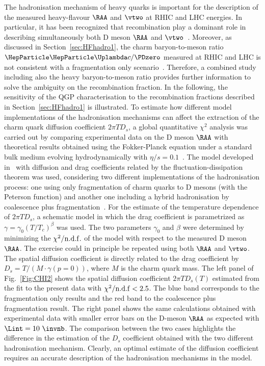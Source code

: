 The hadronisation mechanism of heavy quarks is important for the description of the measured
heavy-flavour $\RAA$ and $\vtwo$ at RHIC and LHC energies. In particular, it has been recognized that recombination
play a dominant role in describing simultaneously both D meson $\RAA$ and $\vtwo$~\cite{PhysRevC.73.034913,Gossiaux:2008jv,He:2011qa,Scardina:2017ipo}.
Moreover, as discussed in Section~\ref{sec:HFhadro1}, the charm baryon-to-meson ratio $\PGLc/\PDzero$ measured at RHIC and LHC is not consistent with a fragmentation only scenario~\cite{Oh:2009zj,Plumari:2017ntm}.
Therefore, a combined study including also the heavy baryon-to-meson ratio provides further
information to solve the ambiguity on the
recombination fraction. In the following, the sensitivity
of the QGP characterisation to the
recombination fractions described in Section~\ref{sec:HFhadro1} is illustrated.
To estimate how different model implementations of the hadronisation mechanisms can affect the extraction of the charm quark diffusion coefficient $2\pi T D_s$,
a global quantitative $\chi^2$ analysis was carried out by comparing experimental data on the D meson $\RAA$ with theoretical
results obtained using the Fokker-Planck equation under a standard bulk medium evolving
hydrodynamically with $\eta/s=0.1$~\cite{Plumari:2015cfa,Ruggieri:2013ova}.
The model developed in~\cite{Das:2015ana,Das:2013kea} with diffusion and drag
coefficients related by the fluctuation-dissipation theorem was used, considering two different
implementations of the hadronisation process: one using only fragmentation of charm quarks to D mesons (with the Peterson function)
and another one including a hybrid hadronisation by coalescence plus fragmentation~\cite{Plumari:2017ntm,Scardina:2017ipo}.
For the estimate of the temperature dependence of $2\pi T D_s$, a schematic model in which the
drag coefficient is parametrized as $\gamma=\gamma_0 (T/T_{c})^{\beta}$ was used. The two parameters $\gamma_0$ and $\beta$ were determined by minimizing the
$\chi^2/{\rm n.d.f.}$ of the model with respect to the measured D meson $\RAA$. The exercise could in principle be repeated using both $\RAA$ and $\vtwo$. 
The spatial diffusion coefficient is directly related to
the drag coefficient by $D_s=T/(M\cdot\gamma (p=0))$, where $M$ is the charm quark mass.
The left panel of Fig.~\ref{Fig:CHI2} shows the spatial diffusion coefficient
$2 \pi T D_s(T)$ estimated from the fit to the present data with $\chi^2/ {\rm n.d.f} < 2.5$. The blue band corresponds to the fragmentation 
only results and the red band to the coalescence plus fragmentation result.
The right panel shows the same calculations obtained with experimental data 
with smaller error bars on the D-meson $\RAA$ as expected with $\Lint=10~\invnb$.
The comparison between the two cases highlights the difference in the estimation 
of the $D_s$ coefficient obtained with the two different hadronisation mechanism.
Clearly, an optimal estimate of the diffusion coefficient requires an accurate description of the hadronisation mechanisms in the model.



